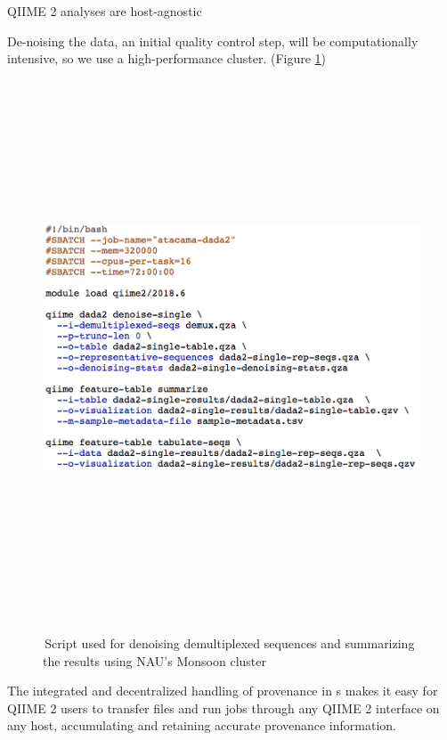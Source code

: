 \documentclass[final]{beamer}
\newlength{\colwidth}
\begin{document}
\begin{frame}[t]
\begin{columns}[t]
\begin{column}{\colwidth}
  \begin{block}{QIIME 2 analyses are host-agnostic}

    De-noising the data, an initial quality control step, will be computationally intensive, so we use a
    high-performance cluster. (Figure \ref{fig:dada2})

    \begin{figure}[tph!]
      {\includegraphics[height=16cm]{assets/HPC_Analysis}}
      \caption{\,Script used for denoising demultiplexed sequences and summarizing the results using NAU's Monsoon cluster}
      \label{fig:dada2}
    \end{figure}

    \begin{tcolorbox}
    [width=\textwidth, colframe=blue]
    {The integrated and decentralized handling of provenance in
    s makes it easy for QIIME 2 users to transfer files and run jobs
    through any QIIME 2 interface on any host, accumulating and retaining
    accurate provenance information}.
  \end{tcolorbox}


\end{block}
\end{column}
\end{columns}
\end{frame}
\end{document}

